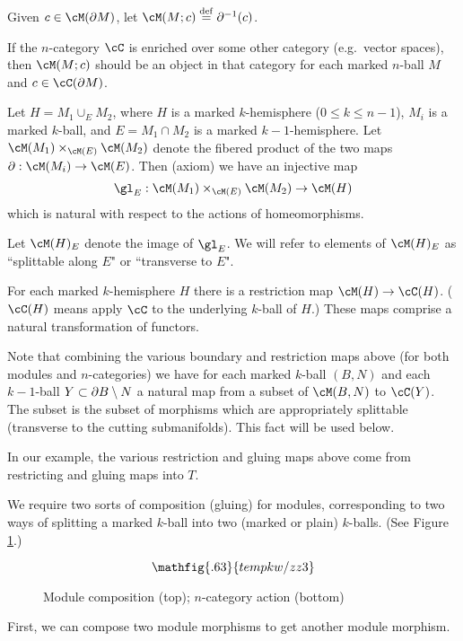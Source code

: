 Given $c\in\cM(\bd M)$, let $\cM(M; c) \deq \bd^{-1}(c)$.

If the $n$-category $\cC$ is enriched over some other category (e.g.\ vector spaces),
then $\cM(M; c)$ should be an object in that category for each marked $n$-ball $M$
and $c\in \cC(\bd M)$.

{Let $H = M_1 \cup_E M_2$, where $H$ is a marked $k$-hemisphere ($0\le k\le n-1$),
$M_i$ is a marked $k$-ball, and $E = M_1\cap M_2$ is a marked $k{-}1$-hemisphere.
Let $\cM(M_1) \times_{\cM(E)} \cM(M_2)$ denote the fibered product of the 
two maps $\bd: \cM(M_i)\to \cM(E)$.
Then (axiom) we have an injective map
\[
	\gl_E : \cM(M_1) \times_{\cM(E)} \cM(M_2) \to \cM(H)
\]
which is natural with respect to the actions of homeomorphisms.}

Let $\cM(H)_E$ denote the image of $\gl_E$.
We will refer to elements of $\cM(H)_E$ as ``splittable along $E$" or ``transverse to $E$". 


{For each marked $k$-hemisphere $H$ there is a restriction map
$\cM(H)\to \cC(H)$.  
($\cC(H)$ means apply $\cC$ to the underlying $k$-ball of $H$.)
These maps comprise a natural transformation of functors.}

Note that combining the various boundary and restriction maps above
(for both modules and $n$-categories)
we have for each marked $k$-ball $(B, N)$ and each $k{-}1$-ball $Y\subset \partial B \setminus N$
a natural map from a subset of $\cM(B, N)$ to $\cC(Y)$.
The subset is the subset of morphisms which are appropriately splittable (transverse to the
cutting submanifolds).
This fact will be used below.

In our example, the various restriction and gluing maps above come from
restricting and gluing maps into $T$.

We require two sorts of composition (gluing) for modules, corresponding to two ways
of splitting a marked $k$-ball into two (marked or plain) $k$-balls.
(See Figure \ref{zzz3}.)

\begin{figure}[!ht]
\begin{equation*}
\mathfig{.63}{tempkw/zz3}
\end{equation*}
\caption{Module composition (top); $n$-category action (bottom)}
\label{zzz3}
\end{figure}

First, we can compose two module morphisms to get another module morphism.

